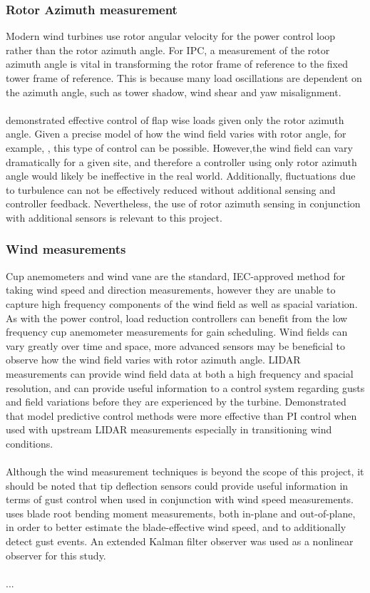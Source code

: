 \subsubsection{Rotor Azimuth measurement}
Modern wind turbines use rotor angular velocity for the power control loop rather than the rotor azimuth angle. For IPC, a measurement of the rotor azimuth angle is vital in transforming the rotor frame of reference to the fixed tower frame of reference. This is because many load oscillations are dependent on the azimuth angle, such as tower shadow, wind shear and yaw misalignment. 
\\~\\
\citet{4_trudnowski} demonstrated effective control of flap wise loads given only the rotor azimuth angle. Given a precise model of how the wind field varies with rotor angle, for example, \citet{13_Dolan}, this type of control can be possible. However,the wind field can vary dramatically for a given site, and therefore a controller using only rotor azimuth angle would likely be ineffective in the real world. Additionally, fluctuations due to turbulence can not be effectively reduced without additional sensing and controller feedback. Nevertheless, the use of rotor azimuth sensing in conjunction with additional sensors is relevant to this project.

\subsubsection{Wind measurements}
Cup anemometers and wind vane are the standard, IEC-approved method for taking wind speed and direction measurements, however they are unable to capture high frequency components of the wind field as well as spacial variation. As with the power control, load reduction controllers can benefit from the low frequency cup anemometer measurements for gain scheduling. Wind fields can vary greatly over time and space, more advanced sensors may be beneficial to observe how the wind field varies with rotor azimuth angle. LIDAR measurements can provide wind field data at both a high frequency and spacial resolution, and can provide useful information to a control system regarding gusts and field variations before they are experienced by the turbine. \citet{6_Mirzaei} Demonstrated that model predictive control methods were more effective than PI control when used with upstream LIDAR measurements especially in transitioning wind conditions. 
\\~\\
Although the wind measurement techniques is beyond the scope of this project, it should be noted that tip deflection sensors could provide useful information in terms of gust control when used in conjunction with wind speed measurements. \citet{2_Kanev} uses blade root bending moment measurements, both in-plane and out-of-plane, in order to better estimate the blade-effective wind speed, and to additionally detect gust events. An extended Kalman filter observer was used as a nonlinear observer for this study.
\\~\\
...
